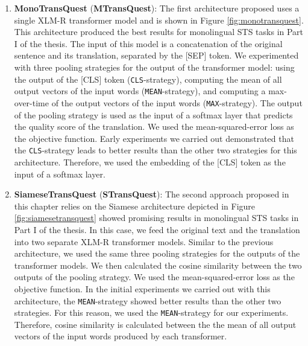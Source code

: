 \begin{enumerate}
	\item \textbf{MonoTransQuest} (\textbf{MTransQuest}): 
The first architecture proposed uses a single XLM-R transformer model and is shown in Figure \ref{fig:monotransquest}. This architecture produced the best results for monolingual STS tasks in Part I of the thesis. The input of this model is a concatenation of the original sentence and its translation, separated by the \textsc{[SEP]} token. We experimented with three pooling strategies for the output of the transformer model: using the output of the \textsc{[CLS]} token (\texttt{CLS}-strategy), computing the mean of all output vectors of the input words (\texttt{MEAN}-strategy), and computing a max-over-time of the output vectors of the input words (\texttt{MAX}-strategy). The output of the pooling strategy is used as the input of a softmax layer that predicts the quality score of the translation. We used the mean-squared-error loss as the objective function. Early experiments we carried out demonstrated that the \texttt{CLS}-strategy leads to better results than the other two strategies for this architecture. Therefore,  we used the embedding of the \textsc{[CLS]} token as the input of a softmax layer.
	
	
	\item \textbf{SiameseTransQuest} (\textbf{STransQuest}): The second approach proposed in this chapter relies on the Siamese architecture depicted in Figure \ref{fig:siamesetransquest} showed promising results in monolingual STS tasks \autocite{reimers-gurevych-2019-sentence} in Part I of the thesis. In this case, we feed the original text and the translation into two separate XLM-R transformer models. Similar to the previous architecture, we used the same three pooling strategies for the outputs of the transformer models. We then calculated the cosine similarity between the two outputs of the pooling strategy. We used the mean-squared-error loss as the objective function. In the initial experiments we carried out with this architecture, the \texttt{MEAN}-strategy showed better results than the other two strategies. For this reason, we used the \texttt{MEAN}-strategy for our experiments. Therefore, cosine similarity is calculated between the the mean of all output vectors of the input words produced by each transformer. 

	
\end{enumerate}


